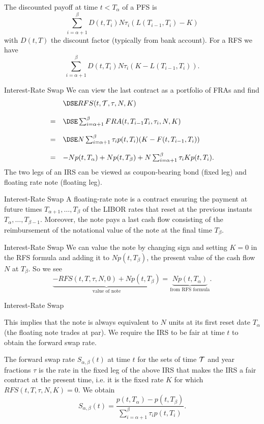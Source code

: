 The discounted payoff at time $t<T_{\alpha}$ of a PFS is
$$
\sum_{i=\alpha+1}^{\beta}D(t,T_i)N\tau_i(L(T_{i-1},T_i)-K)
$$
with $D(t,T)$ the discount factor (typically from bank account).
For a RFS we have
$$
\sum_{i=\alpha+1}^{\beta}D(t,T_i)N\tau_i(K-L(T_{i-1},T_i)).
$$


{Interest-Rate Swap}
We
can view the last contract as a portfolio of FRAs and find
$$
\begin{array}{ll}
& \DSE RFS(t,{\cal T},\tau,N,K) \\*[12pt] = & \DSE \sum_{i=\alpha+1}^{\beta}FRA(t,T_{i-1}T_i,\tau_i,N,K) \\*[12pt]
= & \DSE N\sum_{i=\alpha+1}^{\beta}\tau_i p(t,T_i)(K-F(t,T_{i-1},T_i))\\*[12pt]
= & -N   p(t,T_{\alpha})+Np(t,T_{\beta})+N\sum_{i=\alpha+1}^{\beta}\tau_i Kp(t,T_i).
\end{array}
$$
The two legs of an IRS can be viewed as
coupon-bearing bond (fixed leg) and floating rate note (floating
leg).


{Interest-Rate Swap}
A floating-rate note is a
contract ensuring the payment at future times
$T_{\alpha+1},\ldots,T_{\beta}$ of the LIBOR rates that reset at the previous instants
$T_{\alpha},\ldots,T_{\beta-1}$. Moreover, the note pays a last
cash flow consisting of the reimbursement of the notational value
of the note at the final time $T_{\beta}$.


{Interest-Rate Swap}
We can value the note by changing sign and setting $K=0$ in the
RFS formula and adding it to $Np(t,T_{\beta})$, the present value
of the cash flow $N$ at $T_{\beta}$. So we see
$$
\underbrace{-RFS(t,T,\tau,N,0)+Np(t,T_{\beta})}_{\mbox{value of note}}=
\underbrace{Np(t,T_{\alpha})}_{\mbox{from RFS formula}}.
$$


{Interest-Rate Swap}

This implies that the note is always equivalent to $N$ units at
its first reset date $T_{\alpha}$ (the floating note trades at
par). We require the IRS to be fair at time $t$ to obtain the
forward swap rate.

The forward swap rate $S_{\alpha,\beta}(t)$ at time $t$ for the
sets of time $\cal T$ and year fractions $\tau$ is the rate in the
fixed leg of the above IRS that makes the IRS a fair contract at
the present time, i.e. it is the fixed rate $K$ for which
$RFS(t,T,\tau,N,K)=0$. We obtain
\begin{equation}\label{FSR-1}
S_{\alpha,\beta}(t)=\frac{p(t,T_{\alpha})-p(t,T_{\beta})}{\sum_{i=\alpha+1}^{\beta}\tau_ip(t,T_i)}.
\end{equation}


